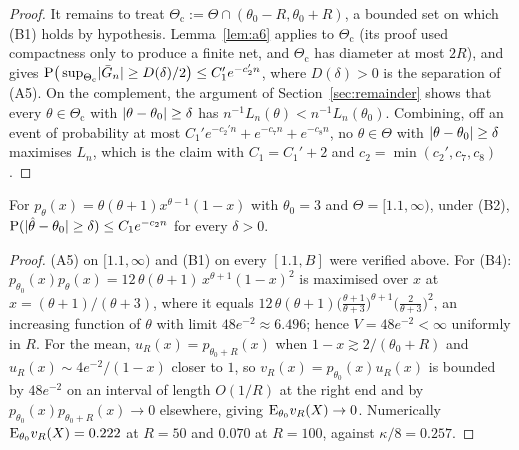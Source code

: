 \begin{proof}
It remains to treat $\Theta_{\mathrm{c}}:=\Theta\cap(\theta_0-R,\theta_0+R)$, a bounded set on which (B1) holds by hypothesis. Lemma~\ref{lem:a6} applies to $\Theta_{\mathrm{c}}$ (its proof used compactness only to produce a finite net, and $\Theta_{\mathrm{c}}$ has diameter at most $2R$), and gives $\mathrm{P}\big(\sup_{\Theta_{\mathrm{c}}}\lvert\bar G_n\rvert\ge D(\delta)/2\big)\le C_1'e^{-c_2'n}$, where $D(\delta)>0$ is the separation of (A5). On the complement, the argument of Section~\ref{sec:remainder} shows that every $\theta\in\Theta_{\mathrm{c}}$ with $\lvert\theta-\theta_0\rvert\ge\delta$ has $n^{-1}L_n(\theta)<n^{-1}L_n(\theta_0)$. Combining, off an event of probability at most $C_1'e^{-c_2'n}+e^{-c_7n}+e^{-c_8n}$, no $\theta\in\Theta$ with $\lvert\theta-\theta_0\rvert\ge\delta$ maximises $L_n$, which is the claim with $C_1=C_1'+2$ and $c_2=\min(c_2',c_7,c_8)$.
\end{proof}

\begin{corollary}[Beta shape family on $[1.1,\infty)$]
\label{cor:consistency-beta}
For $p_\theta(x)=\theta(\theta+1)x^{\theta-1}(1-x)$ with $\theta_0=3$ and $\Theta=[1.1,\infty)$, under (B2), $\mathrm{P}(\lvert\hat\theta-\theta_0\rvert\ge\delta)\le C_1e^{-c_2n}$ for every $\delta>0$.
\end{corollary}

\begin{proof}
(A5) on $[1.1,\infty)$ and (B1) on every $[1.1,B]$ were verified above. For (B4): $p_{\theta_0}(x)p_\theta(x)=12\,\theta(\theta+1)\,x^{\theta+1}(1-x)^2$ is maximised over $x$ at $x=(\theta+1)/(\theta+3)$, where it equals $12\,\theta(\theta+1)\big(\tfrac{\theta+1}{\theta+3}\big)^{\theta+1}\big(\tfrac{2}{\theta+3}\big)^2$, an increasing function of $\theta$ with limit $48e^{-2}\approx6.496$; hence $V=48e^{-2}<\infty$ uniformly in $R$. For the mean, $u_R(x)=p_{\theta_0+R}(x)$ when $1-x\gtrsim2/(\theta_0+R)$ and $u_R(x)\sim4e^{-2}/(1-x)$ closer to $1$, so $v_R(x)=p_{\theta_0}(x)u_R(x)$ is bounded by $48e^{-2}$ on an interval of length $O(1/R)$ at the right end and by $p_{\theta_0}(x)p_{\theta_0+R}(x)\to0$ elsewhere, giving $\mathrm{E}_{\theta_0}v_R(X)\to0$. Numerically $\mathrm{E}_{\theta_0}v_R(X)=0.222$ at $R=50$ and $0.070$ at $R=100$, against $\kappa/8=0.257$.
\end{proof}

